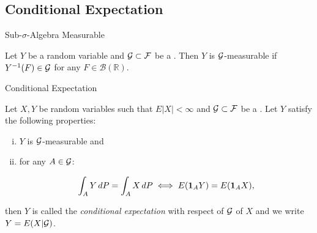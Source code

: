 
\subsection{Conditional Expectation}

\begin{definition}{8.1}{Sub-$\sigma$-Algebra Measurable}

    Let $Y$ be a random variable and $\mathcal{G} \subset \mathcal{F}$ be a \SigmaAlgebra. Then $Y$ is $\mathcal{G}$-measurable if $Y^{-1}(F) \in \mathcal{G}$ for any $F \in \mathcal{B}(\mathbb{R})$.

\end{definition}

\begin{definition}{8.2}{Conditional Expectation}

    Let $X,Y$ be random variables such that $E|X| < \infty$ and $\mathcal{G} \subset \mathcal{F}$ be a \SigmaAlgebra. Let $Y$ satisfy the following properties:

        \begin{enumerate}[(i)]
            \setlength{\parskip}{0em}
            \item $Y$ is $\mathcal{G}$-measurable and
            \item for any $A \in \mathcal{G}$:

                    \begin{align*}
                        \int_{A} Y \, dP = \int_{A} X \, dP
                        \iff E(\mathbf{1}_{A}Y) = E(\mathbf{1}_{A}X),
                    \end{align*}
        \end{enumerate}

    then $Y$ is called the \emph{conditional expectation} with respect of $\mathcal{G}$ of $X$ and we write $Y = E(X|\mathcal{G})$.

\end{definition}
